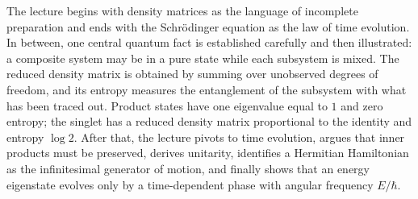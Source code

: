 The lecture begins with density matrices as the language of incomplete preparation and ends with the Schr\"odinger equation as the law of time evolution. In between, one central quantum fact is established carefully and then illustrated: a composite system may be in a pure state while each subsystem is mixed. The reduced density matrix is obtained by summing over unobserved degrees of freedom, and its entropy measures the entanglement of the subsystem with what has been traced out. Product states have one eigenvalue equal to \(1\) and zero entropy; the singlet has a reduced density matrix proportional to the identity and entropy \(\log 2\). After that, the lecture pivots to time evolution, argues that inner products must be preserved, derives unitarity, identifies a Hermitian Hamiltonian as the infinitesimal generator of motion, and finally shows that an energy eigenstate evolves only by a time-dependent phase with angular frequency \(E/\hbar\).